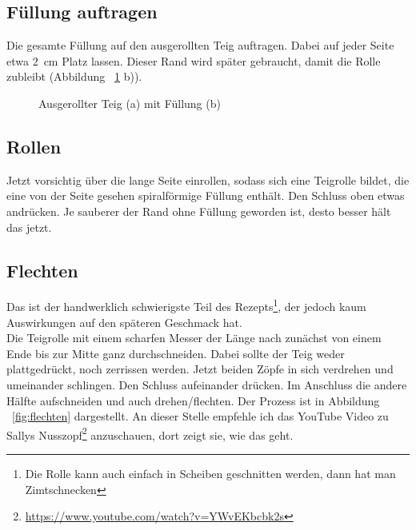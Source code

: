 \documentclass[a4paper, oneside]{recipe}
\begin{document}
\subsection*{Füllung auftragen}
Die gesamte Füllung auf den ausgerollten Teig auftragen. Dabei auf jeder Seite etwa 2~cm Platz lassen. Dieser Rand wird später gebraucht, damit die Rolle zubleibt  
(Abbildung ~\ref{fig:fuellung} b)).

\begin{figure}[h]
  \centering
  \quad
  \caption{Ausgerollter Teig (a) mit Füllung (b)}
  \label{fig:fuellung}
\end{figure}

\subsection*{Rollen}
Jetzt vorsichtig über die lange Seite einrollen, sodass sich eine Teigrolle bildet, die eine von der Seite gesehen spiralförmige Füllung enthält. Den Schluss oben etwas andrücken. Je sauberer der Rand ohne Füllung geworden ist, desto besser hält das jetzt.

\subsection*{Flechten}
Das ist der handwerklich schwierigste Teil des Rezepts\footnote{Die Rolle kann auch einfach in Scheiben geschnitten werden, dann hat man Zimtschnecken}, der jedoch kaum Auswirkungen auf den späteren Geschmack hat. \\
Die Teigrolle mit einem scharfen Messer der Länge nach zunächst von einem Ende bis zur Mitte ganz durchschneiden. Dabei sollte der Teig weder plattgedrückt, noch zerrissen werden. Jetzt beiden Zöpfe in sich verdrehen und umeinander schlingen. Den Schluss aufeinander drücken. Im Anschluss die andere Hälfte aufschneiden und auch drehen/flechten. Der Prozess ist in Abbildung ~\ref{fig:flechten} dargestellt. An dieser Stelle empfehle ich das YouTube Video zu Sallys Nusszopf\footnote{\url{https://www.youtube.com/watch?v=YWvEKbcbk2s}} anzuschauen, dort zeigt sie, wie das geht.
\end{document}
